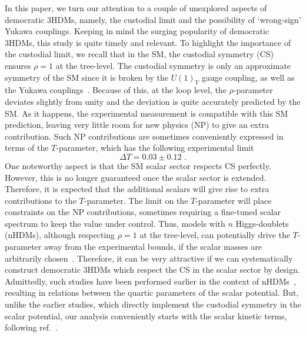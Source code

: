 \documentclass[11pt]{article}
\begin{document}
In this paper, we turn our attention to a couple of unexplored aspects of democratic 3HDMs, namely, the custodial limit and the possibility of `wrong-sign' Yukawa couplings.  
Keeping in mind the surging popularity of democratic 3HDMs, this study is quite timely and relevant.  
To highlight the importance of the custodial limit, we recall that in the SM, the custodial symmetry (CS) ensures $\rho=1$ at the tree-level.  
The custodial symmetry is only an approximate symmetry of the SM since it is broken by the $U(1)_Y$ gauge coupling, as well as the Yukawa couplings~\cite{Willenbrock:2004hu}.  
Because of this, at the loop level, the $\rho$-parameter deviates slightly from unity and the deviation is quite accurately predicted by the SM.  
As it happens, the experimental measurement is compatible with this SM prediction, leaving very little room for new physics (NP) to give an extra contribution.  
Such NP contributions are sometimes conveniently expressed in terms of the $T$-parameter, which has the following experimental limit~\cite{Workman:2022ynf}
\begin{equation}
\Delta T = 0.03 \pm 0.12 \nonumber \,\,.
\end{equation}
One noteworthy aspect is that the SM scalar sector respects CS perfectly.  
However, this is no longer guaranteed once the scalar sector is extended.  
Therefore, it is expected that the additional scalars will give rise to extra contributions to the $T$-parameter.  
The limit on the $T$-parameter will place constraints on the NP contributions, sometimes requiring a fine-tuned scalar spectrum to keep the value under control.  
%
Thus, models with $n$ Higgs-doublets (nHDMs), although respecting $\rho=1$ at the tree-level, can potentially drive the $T$-parameter away from the experimental bounds, if the scalar masses are arbitrarily chosen~\cite{Pomarol:1993mu,Haber:2010bw, Grimus:2007if, Grimus:2008nb}.  
Therefore, it can be very attractive if we can systematically construct democratic 3HDMs which respect the CS in the scalar sector by design.  
%
Admittedly, such studies have been performed earlier in the context of nHDMs~\cite{Olaussen:2010aq, Nishi:2011gc, Solberg:2018aav,Grzadkowski:2010dj,Darvishi:2019dbh}, resulting in relations between the quartic parameters of the scalar potential.  
But, unlike the earlier studies, which directly implement the custodial symmetry in the scalar potential, our analysis conveniently starts with the scalar kinetic terms, following ref.~\cite{Kundu:2021pcg}.  
\end{document}
